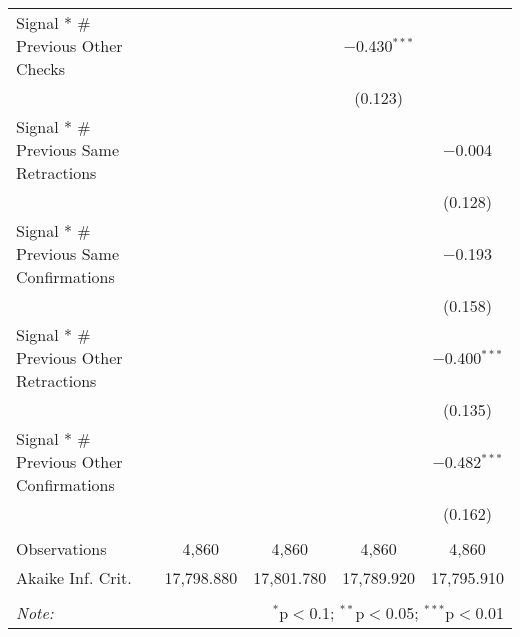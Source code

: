 \begin{table}[!htbp]
\begin{tabular}{@{\extracolsep{5pt}}lcccc}
  Signal * \# Previous Other Checks &  &  & $-$0.430$^{***}$ &  \\ 
  &  &  & (0.123) &  \\ 
  Signal * \# Previous Same Retractions &  &  &  & $-$0.004 \\ 
  &  &  &  & (0.128) \\ 
  Signal * \# Previous Same Confirmations &  &  &  & $-$0.193 \\ 
  &  &  &  & (0.158) \\ 
  Signal * \# Previous Other Retractions &  &  &  & $-$0.400$^{***}$ \\ 
  &  &  &  & (0.135) \\ 
  Signal * \# Previous Other Confirmations &  &  &  & $-$0.482$^{***}$ \\ 
  &  &  &  & (0.162) \\ 
 \hline \\[-1.8ex] 
Observations & 4,860 & 4,860 & 4,860 & 4,860 \\ 
Akaike Inf. Crit. & 17,798.880 & 17,801.780 & 17,789.920 & 17,795.910 \\ 
\hline 
\hline \\[-1.8ex] 
\textit{Note:}  & \multicolumn{4}{r}{$^{*}$p$<$0.1; $^{**}$p$<$0.05; $^{***}$p$<$0.01} \\ 
\end{tabular} 
\end{table} 
